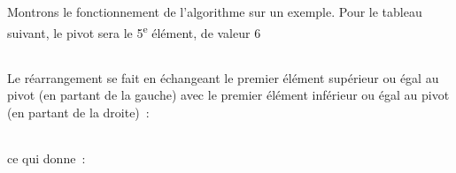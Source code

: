 		Montrons le fonctionnement de l'algorithme sur un exemple. 
		Pour le tableau suivant, le pivot sera le 5\textsuperscript{e} 
		élément, de valeur 6~

		\begin{center}
			\tablefirsthead{}
			\tablehead{}
			\tabletail{}
			\tablelasttail{}
			\begin{supertabular}{|m{1.171cm}|m{1.206cm}|m{1.206cm}|m{1.206cm}|m{1.206cm}|m{1.206cm}|m{1.206cm}|m{1.206cm}|m{1.206cm}|m{1.232cm}|}
			\hline
			 &
			 &
			 &
			 &
			 &
			 &
			 &
			 &
			 &
			\centering{}\\\hline
			\end{supertabular}
		\end{center}

		Le réarrangement se fait en échangeant le premier élément supérieur 
		ou égal au pivot (en partant de la gauche) avec le premier élément 
		inférieur ou égal au pivot (en partant de la droite)~:

		\begin{center}
			\tablefirsthead{}
			\tablehead{}
			\tabletail{}
			\tablelasttail{}
			\begin{supertabular}{|m{1.171cm}|m{1.206cm}|m{1.206cm}|m{1.206cm}|m{1.206cm}|m{1.206cm}|m{1.206cm}|m{1.206cm}|m{1.206cm}|m{1.232cm}|}
			\hline
			 &
			 &
			 &
			 &
			 &
			 &
			 &
			 &
			 &
			\centering{}\\\hline
			\end{supertabular}
		\end{center}

		ce qui donne~:

		\begin{center}
			\tablefirsthead{}
			\tablehead{}
			\tabletail{}
			\tablelasttail{}
			\begin{supertabular}{|m{1.171cm}|m{1.206cm}|m{1.206cm}|m{1.206cm}|m{1.206cm}|m{1.206cm}|m{1.206cm}|m{1.206cm}|m{1.206cm}|m{1.232cm}|}
			\hline
			 &
			 &
			 &
			 &
			 &
			 &
			 &
			 &
			 &
			\centering{}\\\hline
			\end{supertabular}
		\end{center}

